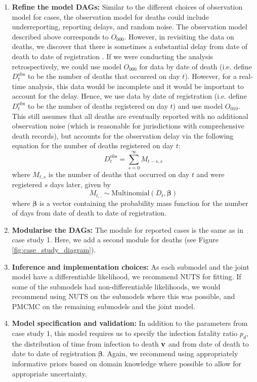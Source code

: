\documentclass{article}
\begin{document}
\begin{enumerate}
\item \textbf{Refine the model DAGs:}       
    Similar to the different choices of observation model for cases, the observation model for deaths could include underreporting, reporting delays, and random noise. The observation model described above corresponds to $O_{000}$. However, in revisiting the data on deaths, we discover that there is sometimes a substantial delay from date of death to date of registration \citep{seaman2022nowcasting}. If we were conducting the analysis retrospectively, we could use model $O_{000}$ for data by date of death (i.e. define $D^\mathrm{obs}_t$ to be the number of deaths that occurred on day $t$). However, for a real-time analysis, this data would be incomplete and it would be important to account for the delay. Hence, we use data by date of registration (i.e. define $D^\mathrm{obs}_t$ to be the number of deaths registered on day $t$) and use model $O_{010}$. This still assumes that all deaths are eventually reported with no additional observation noise (which is reasonable for jurisdictions with comprehensive death records), but accounts for the observation delay via the following equation for the number of deaths registered on day $t$:
\begin{equation}
    D^\mathrm{obs}_t = \sum_{s=0}^\infty M_{t-s,s}
\end{equation}
where $M_{t,s}$ is the number of deaths that occurred on day $t$ and were registered $s$ days later, given by
\begin{equation}
    M_{t,.} \sim \mathrm{Multinomial}\left( D_t, \boldsymbol{\beta}\right) 
\end{equation}
where $\boldsymbol{\beta}$ is a vector containing the probability mass function for the number of days from date of death to date of registration.

 \item \textbf{Modularise the DAGs:} The module for reported cases is the same as in case study 1. Here, we add a second module for deaths (see Figure \ref{fig:case_study_diagram}).

\item \textbf{Inference and implementation choices:} As each submodel and the joint model have a differentiable likelihood, we recommend NUTS for fitting. If some of the submodels had non-differentiable likelihoods, we would recommend using \ac{NUTS} on the submodels where this was possible, and \ac{PMCMC} on the remaining submodels and the joint model.

\item \textbf{Model specification and validation:} In addition to the parameters from case study 1, this model requires us to specify the infection fatality ratio $p_d$, the distribution of time from infection to death $\bf{v}$ and from date of death to date to date of registration $\boldsymbol{\beta}$. Again, we recommend using appropriately informative priors based on domain knowledge where possible to allow for appropriate uncertainty. 



\end{enumerate}
\end{document}
